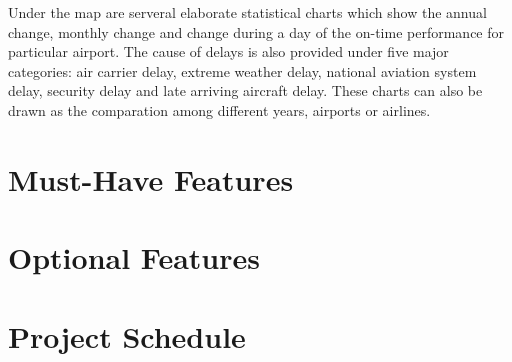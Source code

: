 \documentclass[12pt]{article}
\begin{document}
Under the map are serveral elaborate statistical charts which show the annual change, monthly change and change during a day of the on-time performance for particular airport. The cause of delays is also provided under five major categories: air carrier delay, extreme weather delay, national aviation system delay, security delay and late arriving aircraft delay. These charts can also be drawn as the comparation among different years, airports or airlines.

\section{Must-Have Features}
\section{Optional Features}
\section{Project Schedule}






\renewcommand\refname{Reference}


\end{document}
